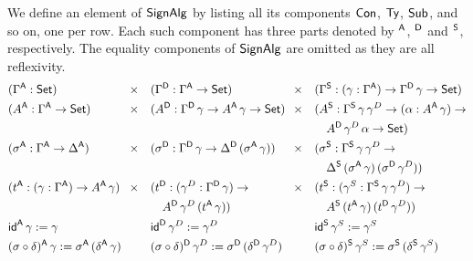 \documentclass[a4paper,UKenglish,cleveref, autoref]{lipics-v2019}
\begin{document}
\begin{definition}\label{def:ads}
  We define an element of $\SignAlg$ by listing all its components
  $\Con$, $\Ty$, $\Sub$, and so on, one per row. Each such component
  has three parts denoted by $^\A$, $^\D$ and $^\S$, respectively. The
  equality components of $\SignAlg$ are omitted as they are all
  reflexivity.
  \begin{alignat*}{10}
    & (\Gamma^\A:\Set) && \hspace{-0.3em}\times && (\Gamma^\D:\Gamma^\A\ra\Set) && \hspace{-0.3em}\times && (\Gamma^\S:(\gamma:\Gamma^\A)\ra\Gamma^\D\,\gamma\ra\Set) \\
    & (A^\A:\Gamma^\A\ra\Set) && \hspace{-0.3em}\times && (A^\D:\Gamma^\D\,\gamma\ra A^\A\,\gamma\ra\Set) && \hspace{-0.3em}\times && (A^\S:\Gamma^\S\,\gamma\,\gamma^D\ra(\alpha:A^\A\,\gamma)\ra \\
    & && && && && \hspace{1em} A^\D\,\gamma^D\,\alpha\ra\Set) \\
    & (\sigma^\A:\Gamma^\A\ra\Delta^\A) && \hspace{-0.3em}\times && (\sigma^\D:\Gamma^\D\,\gamma\ra\Delta^\D\,(\sigma^\A\,\gamma)) && \hspace{-0.3em}\times && (\sigma^\S:\Gamma^\S\,\gamma\,\gamma^D\ra \\
    & && && && && \hspace{1em} \Delta^\S\,(\sigma^\A\,\gamma)\,(\sigma^\D\,\gamma^D)) \\
    & (t^\A:(\gamma:\Gamma^\A)\ra A^\A\,\gamma) && \hspace{-0.3em}\times && (t^\D:(\gamma^D:\Gamma^\D\,\gamma)\ra && \hspace{-0.3em}\times && (t^\S:(\gamma^S:\Gamma^\S\,\gamma\,\gamma^D)\ra \\
    & && && \hspace{1em} A^\D\,\gamma^D\,(t^\A\,\gamma)) && && \hspace{1em}  A^\S\,(t^\A\,\gamma)\,(t^\D\,\gamma^D)) \\
    & \id^\A\,\gamma := \gamma && && \id^\D\,\gamma^D:=\gamma^D && && \id^\S\,\gamma^S := \gamma^S \\
    & (\sigma\circ\delta)^\A\,\gamma := \sigma^\A\,(\delta^\A\,\gamma) && && (\sigma\circ\delta)^\D\,\gamma^D := \sigma^\D\,(\delta^\D\,\gamma^D) && && (\sigma\circ\delta)^\S\,\gamma^S := \sigma^\S\,(\delta^\S\,\gamma^S) \\

\end{alignat*}
\end{definition}
\end{document}
